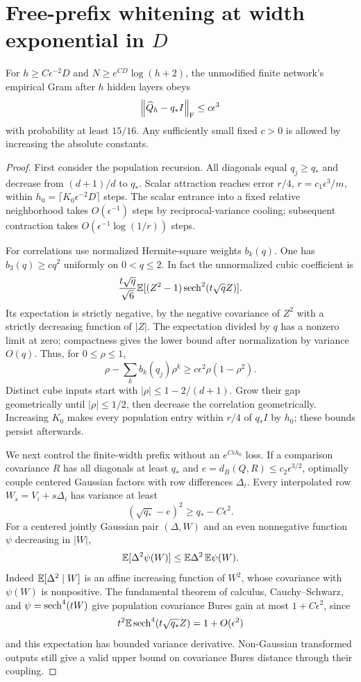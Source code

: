 \documentclass[11pt]{article}
\newcommand{\norm}[1]{\left\lVert#1\right\rVert}
\begin{document}
\section{Free-prefix whitening at width exponential in \texorpdfstring{$D$}{D}}\label{app:prefix}
\begin{lemma}\label{lem:prefix}
For $h\ge C\epsilon^{-2}D$ and $N\ge e^{CD}\log(h+2)$, the unmodified finite network's empirical Gram after $h$ hidden layers obeys
\begin{equation}
 \norm{\widehat Q_h-q_*I}_\F\le c\epsilon^3
\end{equation}
with probability at least $15/16$. Any sufficiently small fixed $c>0$ is allowed by increasing the absolute constants.
\end{lemma}
\begin{proof}
First consider the population recursion. All diagonals equal $q_j\ge q_*$ and decrease from $(d+1)/d$ to $q_*$. Scalar attraction reaches error $r/4$, $r=c_1\epsilon^3/m$, within $h_0=\lceil K_0\epsilon^{-2}D\rceil$ steps. The scalar entrance into a fixed relative neighborhood takes $O(\epsilon^{-1})$ steps by reciprocal-variance cooling; subsequent contraction takes $O(\epsilon^{-1}\log(1/r))$ steps.

For correlations use normalized Hermite-square weights $b_k(q)$. One has $b_3(q)\ge cq^2$ uniformly on $0<q\le2$. In fact the unnormalized cubic coefficient is
\[
 \frac{t\sqrt q}{\sqrt6}\mathbb E[(Z^2-1)\operatorname{sech}^2(t\sqrt q Z)].
\]
Its expectation is strictly negative, by the negative covariance of $Z^2$ with a strictly decreasing function of $|Z|$. The expectation divided by $q$ has a nonzero limit at zero; compactness gives the lower bound after normalization by variance $O(q)$. Thus, for $0\le\rho\le1$,
\[
 \rho-\sum_k b_k(q_j)\rho^k\ge c\epsilon^2\rho(1-\rho^2).
\]
Distinct cube inputs start with $|\rho|\le1-2/(d+1)$. Grow their gap geometrically until $|\rho|\le1/2$, then decrease the correlation geometrically. Increasing $K_0$ makes every population entry within $r/4$ of $q_*I$ by $h_0$; these bounds persist afterwards.

We next control the finite-width prefix without an $e^{C\epsilon h_0}$ loss. If a comparison covariance $R$ has all diagonals at least $q_*$ and $e=d_B(Q,R)\le c_2\epsilon^{3/2}$, optimally couple centered Gaussian factors with row differences $\Delta_i$. Every interpolated row $W_s=V_i+s\Delta_i$ has variance at least
\[
 (\sqrt{q_*}-e)^2\ge q_*-C\epsilon^2.
\]
For a centered jointly Gaussian pair $(\Delta,W)$ and an even nonnegative function $\psi$ decreasing in $|W|$,
\[
 \mathbb E[\Delta^2\psi(W)]\le\mathbb E\Delta^2\,\mathbb E\psi(W).
\]
Indeed $\mathbb E[\Delta^2\mid W]$ is an affine increasing function of $W^2$, whose covariance with $\psi(W)$ is nonpositive. The fundamental theorem of calculus, Cauchy--Schwarz, and $\psi=\operatorname{sech}^4(tW)$ give population covariance Bures gain at most $1+C\epsilon^2$, since
\[
 t^2\mathbb E\operatorname{sech}^4(t\sqrt{q_*}Z)=1+O(\epsilon^2)
\]
and this expectation has bounded variance derivative. Non-Gaussian transformed outputs still give a valid upper bound on covariance Bures distance through their coupling.


\end{proof}
\end{document}
